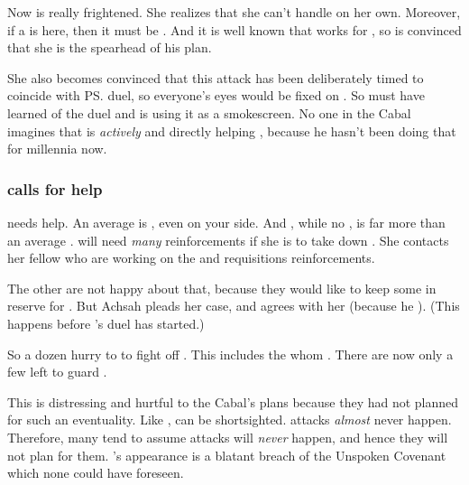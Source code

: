 Now \Achsah{} is really frightened. 
She realizes that she can't handle \Nzessuacrith{} on her own. 
Moreover, if a \dragon{} is here, then it must be . 
And it is well known that \Nzessuacrith{} works for \Secherdamon, so \Achsah{} is convinced that she is the spearhead of his plan. 

She also becomes convinced that this attack has been deliberately timed to coincide with \ps{\Teshrial} duel, so everyone's eyes would be fixed on \Malcur. 
So \Secherdamon{} must have learned of the duel and is using it as a smokescreen. 
No one in the Cabal imagines that \Ishnaruchaefir{} is \emph{actively} and directly helping \Secherdamon, because he hasn't been doing that for millennia now. 






\subsubsection{\Achsah calls for help}
\Achsah{} needs help. 
An average \dragon is , even  on your side.
And \Nzessuacrith, while no \shaeeroth, is far more than an average \dragon. 
\Achsah will need \emph{many} reinforcements if she is to take down \Nzessuacrith. 
She contacts her fellow \resphain who are working on the  and requisitions reinforcements. 

The other \resphain are not happy about that, because they would like to keep some in reserve for \Ishnaruchaefir.
But Achsah pleads her case, and \Teshrial agrees with her (because he ).
(This happens before \Teshrial's duel has started.)

So a dozen \resphain hurry to \Forclin to fight off \Nzessuacrith. 
This includes the \resphain{} whom \Teshrial{} . 
There are now only a few left to guard \Malcur. 

This is distressing and hurtful to the Cabal's plans because they had not planned for such an eventuality. 
Like \humans, \resphain can be shortsighted.
\Dragon attacks \emph{almost} never happen.
Therefore, many \resphain tend to assume \dragon attacks will \emph{never} happen, and hence they will not plan for them. 
\Nzessuacrith's appearance is a blatant breach of the Unspoken Covenant which none could have foreseen.

